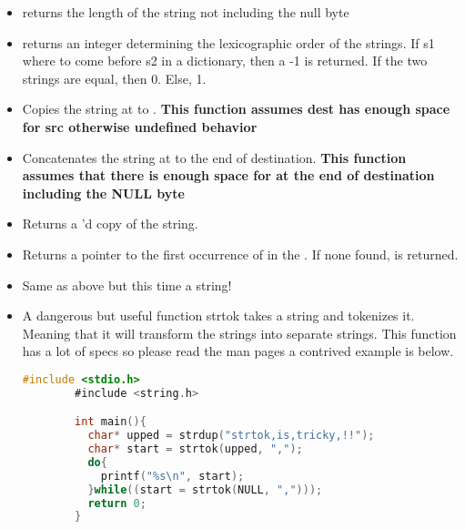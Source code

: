 \begin{itemize}

	\item {} returns the length of the string not including the null byte

	\item {} returns an integer determining the lexicographic order of the strings.
    If s1 where to come before s2 in a dictionary, then a -1 is returned.
    If the two strings are equal, then 0.
    Else, 1.

	\item {} Copies the string at  to .
    \textbf{This function assumes dest has enough space for src otherwise undefined behavior}

	\item {} Concatenates the string at  to the end of destination.
    \textbf{This function assumes that there is enough space for  at the end of destination including the NULL byte}

	\item {} Returns a 'd copy of the string.

	\item {} Returns a pointer to the first occurrence of  in the .
    If none found,  is returned.

	\item {} Same as above but this time a string!

	\item {}

	  A dangerous but useful function strtok takes a string and tokenizes it.
    Meaning that it will transform the strings into separate strings.
    This function has a lot of specs so please read the man pages a contrived example is below.

	      \begin{lstlisting}[language=C]
        #include <stdio.h>
        #include <string.h>

        int main(){
          char* upped = strdup("strtok,is,tricky,!!");
          char* start = strtok(upped, ",");
          do{
            printf("%s\n", start);
          }while((start = strtok(NULL, ",")));
          return 0;
        }
\end{lstlisting}


\end{itemize}
